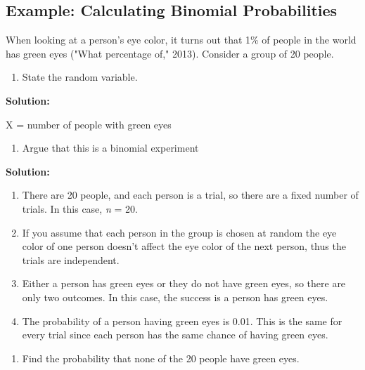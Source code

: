 \documentclass[]{book}
\providecommand{\tightlist}{%
  \setlength{\itemsep}{0pt}\setlength{\parskip}{0pt}}
\begin{document}
\hypertarget{example-calculating-binomial-probabilities}{%
\subsection{Example: Calculating Binomial Probabilities}\label{example-calculating-binomial-probabilities}}

When looking at a person's eye color, it turns out that 1\% of people in the world has green eyes ("What percentage of," 2013). Consider a group of 20 people.

\begin{enumerate}
\def\labelenumi{\alph{enumi}.}
\tightlist
\item
  State the random variable.
\end{enumerate}

\textbf{Solution:}

X = number of people with green eyes

\begin{enumerate}
\def\labelenumi{\alph{enumi}.}
\setcounter{enumi}{1}
\tightlist
\item
  Argue that this is a binomial experiment
\end{enumerate}

\textbf{Solution:}

\begin{enumerate}
\def\labelenumi{\arabic{enumi}.}
\item
  There are 20 people, and each person is a trial, so there are a fixed number of trials. In this case, \emph{n} = 20.
\item
  If you assume that each person in the group is chosen at random the eye color of one person doesn't affect the eye color of the next person, thus the trials are independent.
\item
  Either a person has green eyes or they do not have green eyes, so there are only two outcomes. In this case, the success is a person has green eyes.
\item
  The probability of a person having green eyes is 0.01. This is the same for every trial since each person has the same chance of having green eyes.
\end{enumerate}

\begin{enumerate}
\def\labelenumi{\alph{enumi}.}
\setcounter{enumi}{2}
\tightlist
\item
  Find the probability that none of the 20 people have green eyes.
\end{enumerate}
\end{document}
